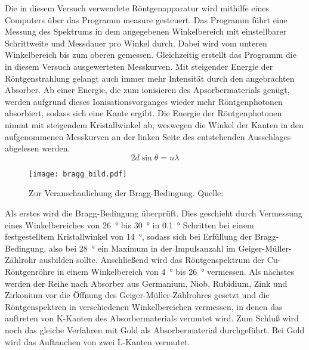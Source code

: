 Die in diesem Versuch verwendete Röntgenapparatur wird mithilfe eines
Computers über das Programm measure gesteuert. Das Programm führt eine
Messung des Spektrums in dem angegebenen Winkelbereich mit einstellbarer
Schrittweite und Messdauer pro Winkel durch. Dabei wird vom unteren
Winkelbereich bis zum oberen gemessen. Gleichzeitig erstellt das
Programm die in diesem Versuch ausgewerteten Messkurven. Mit steigender
Energie der Röntgenstrahlung gelangt auch immer mehr Intensität durch
den angebrachten Absorber. Ab einer Energie, die zum ionisieren des
Apsorbermaterials genügt, werden aufgrund dieses Ionisationsvorganges
wieder mehr Röntgenphotonen absorbiert, sodass sich eine Kante
ergibt. Die Energie der Röntgenphotonen nimmt mit steigendem
Kristallwinkel ab, weswegen die Winkel der Kanten in den aufgenommenen
Messkurven an der linken Seite des entstehenden Ausschlages abgelesen
werden.
%
\begin{equation}
2 d \sin{\theta} = n \lambda
\label{eq:bragg_formel}
\end{equation}
%
%
\begin{figure}
\centering
\texttt{[image: bragg\_bild.pdf]}
\caption{Zur Veranschaulichung der Bragg-Bedingung. Quelle: \textcite{v602}}
\label{fig:bragg_bild}
\end{figure}
%
Als erstes wird die Bragg-Bedingung überprüft. Dies geschieht durch
Vermessung eines Winkelbereiches von \SI{26}{\degree} bis
\SI{30}{\degree} in \SI{0.1}{\degree} Schritten bei einem festgestelltem
Kristallwinkel von \SI{14}{\degree}, sodass sich bei Erfüllung der
Bragg-Bedingung, also bei \SI{28}{\degree} ein Maximum in der
Impulsanzahl im Geiger-Müller-Zählrohr ausbilden sollte.  Anschließend
wird das Röntgenspektrum der Cu-Röntgenröhre in einem Winkelbereich von
\SI{4}{\degree} bis \SI{26}{\degree} vermessen.  Als nächstes werden der
Reihe nach Absorber aus Germanium, Niob, Rubidium, Zink und Zirkonium
vor die Öffnung des Geiger-Müller-Zählrohres gesetzt und die
Röntgenspektren in verschiedenen Winkelbereichen vermessen, in denen das
auftreten von K-Kanten des Absorbermaterials vermutet wird.  Zum Schluß
wird noch das gleiche Verfahren mit Gold als Absorbermaterial
durchgeführt. Bei Gold wird das Auftauchen von zwei L-Kanten vermutet.
%